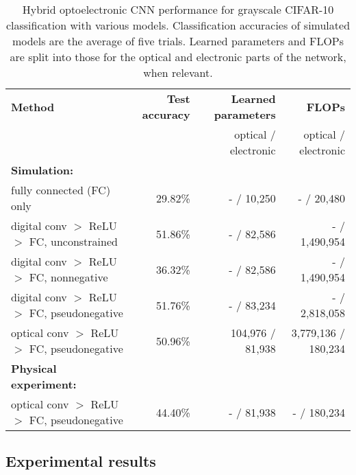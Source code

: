 \documentclass[fleqn,10pt]{wlscirep}
\begin{document}
\setlength{\tabcolsep}{4pt}
\begin{table}
\begin{center}
\caption{Hybrid optoelectronic CNN performance for grayscale CIFAR-10 classification with various models. Classification accuracies of simulated models are the average of five trials. Learned parameters and FLOPs are split into those for the optical and electronic parts of the network, when relevant.}
\label{table:hybrid}
\begin{tabular}{| l | r | r | r |} \hline 
 \textbf{Method} &  \textbf{Test accuracy}  & \textbf{Learned parameters} &  \textbf{\quad \quad FLOPs } \\ 
 &  & optical / electronic & optical / electronic \\
\hline \hline
\textbf{Simulation: } & & &  \\
\quad fully connected (FC) only			& 29.82\%	& - / 10,250 & - / 20,480 \\
\quad digital conv $>$ ReLU $>$ FC, unconstrained 	& 51.86\%	& - / 82,586 & - / 1,490,954 \\
\quad digital conv $>$ ReLU $>$ FC, nonnegative	 & 36.32\%	 & - / 82,586 & - / 1,490,954 \\
\quad digital conv $>$ ReLU $>$ FC, pseudonegative & 51.76\% & - / 83,234 & - / 2,818,058 \\
\quad optical conv $>$ ReLU $>$ FC, pseudonegative 	& 50.96\%  & 104,976 / 81,938 & 3,779,136 / 180,234\\ 
\hline
\textbf{Physical experiment: } & & & \\ 
\quad optical conv $>$ ReLU $>$ FC, pseudonegative & 44.40\% & - / 81,938 & - / 180,234\\
\hline
\end{tabular}
\end{center}
\end{table}
\setlength{\tabcolsep}{1.4pt}


\subsection*{Experimental results}
\end{document}
